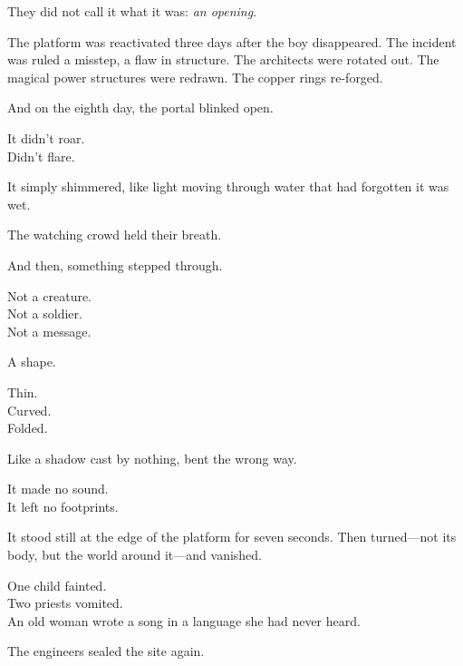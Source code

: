\documentclass[12pt]{article}
\begin{document}
\vspace{0.5em}
They did not call it what it was: \textit{an opening}.

\vspace{0.5em}
The platform was reactivated three days after the boy disappeared. The incident was ruled a misstep, a flaw in structure. The architects were rotated out. The magical power structures were redrawn. The copper rings re-forged.

\vspace{0.5em}
And on the eighth day, the portal blinked open.

\vspace{0.5em}
It didn’t roar.\\
Didn’t flare.

\vspace{0.5em}
It simply shimmered, like light moving through water that had forgotten it was wet.

\vspace{0.5em}
The watching crowd held their breath.

\vspace{0.5em}
And then, something stepped through.

\vspace{0.5em}
Not a creature.\\
Not a soldier.\\
Not a message.

\vspace{0.5em}
A shape.

\vspace{0.5em}
Thin.\\
Curved.\\
Folded.

\vspace{0.5em}
Like a shadow cast by nothing, bent the wrong way.

\vspace{0.5em}
It made no sound.\\
It left no footprints.

\vspace{0.5em}
It stood still at the edge of the platform for seven seconds. Then turned---not its body, but the world around it---and vanished.

\vspace{0.5em}
One child fainted.\\
Two priests vomited.\\
An old woman wrote a song in a language she had never heard.

\vspace{0.5em}
The engineers sealed the site again.
\end{document}
